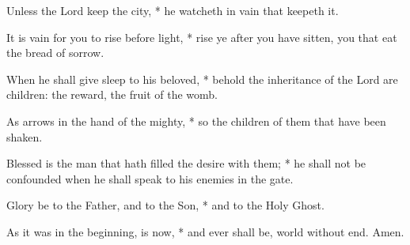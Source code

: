 ﻿\item Unless the Lord keep the city, * he watcheth in vain that keepeth it.
\item It is vain for you to rise before light, * rise ye after you have sitten, you that eat the bread of sorrow.
\item When he shall give sleep to his beloved, * behold the inheritance of the Lord are children: the reward, the fruit of the womb.
\item As arrows in the hand of the mighty, * so the children of them that have been shaken.
\item Blessed is the man that hath filled the desire with them; * he shall not be confounded when he shall speak to his enemies in the gate.
\item Glory be to the Father, and to the Son, * and to the Holy Ghost.
\item As it was in the beginning, is now, * and ever shall be, world without end. Amen.